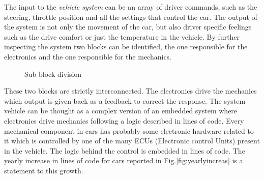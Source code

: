 \documentclass[../main.tex]{subfiles}
\begin{document}
The input to the \textit{vehicle system} can be an array of driver commands, such as the steering, throttle position and all the settings that control the car. The output of the system is not only the movement of the car, but also driver specific feelings such as the drive comfort or just the temperature in the vehicle. By further inspecting the system two blocks can be identified, the one responsible for the electronics and the one responsible for the mechanics. 
     \begin{figure}[ht]
        \begin{center}
        \end{center}
        \caption{Sub block division}
    \end{figure}       
These two blocks are strictly interconnected. The electronics drive the mechanics which output is given back as a feedback to correct the response. The system vehicle can be thought as a complex version of an embedded system where electronics drive mechanics following a logic described in lines of code.
Every mechanical component in cars has probably some electronic hardware related to it which is controlled by one of the many \gls{ECU}s (Electronic control Units) present in the vehicle. The logic behind the control is embedded in lines of code. The yearly increase in lines of code for cars reported in Fig.\ref{fig:yearlyincreas} is a statement to this growth. 
\end{document}
